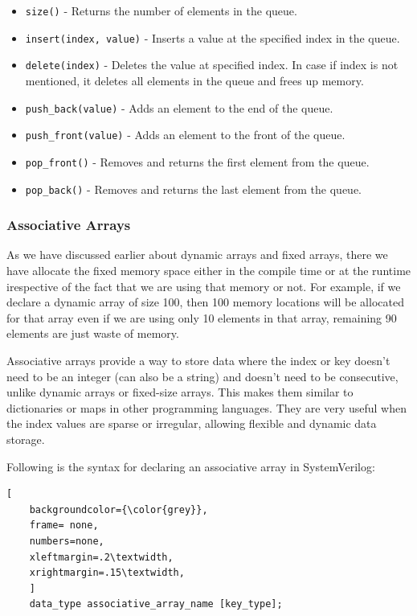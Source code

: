 \documentclass[12pt, a4paper]{article}
\begin{document}
\begin{itemize}[nosep]
    \item \texttt{size()} - Returns the number of elements in the queue.
    \item \texttt{insert(index, value)} - Inserts a value at the specified index in the queue.
    \item \texttt{delete(index)} - Deletes the value at specified index. In case if index is not mentioned, it deletes all elements in the queue and frees up memory.
    \item \texttt{push\_back(value)} - Adds an element to the end of the queue.
    \item \texttt{push\_front(value)} - Adds an element to the front of the queue.
    \item \texttt{pop\_front()} - Removes and returns the first element from the queue.
    \item \texttt{pop\_back()} - Removes and returns the last element from the queue.
\end{itemize}

\subsubsection{Associative Arrays}
As we have discussed earlier about dynamic arrays and fixed arrays, there we have allocate the fixed memory space either in the compile time or at the runtime irespective of the fact that we are using that memory or not. For example, if we declare a dynamic array of size 100, then 100 memory locations will be allocated for that array even if we are using only 10 elements in that array, remaining 90 elements are just waste of memory. 

\vspace{1em}

Associative arrays provide a way to store data where the index or key doesn't need to be an integer (can also be a string) and doesn't need to be consecutive, unlike dynamic arrays or fixed-size arrays. This makes them similar to dictionaries or maps in other programming languages. They are very useful when the index values are sparse or irregular, allowing flexible and dynamic data storage.

Following is the syntax for declaring an associative array in SystemVerilog:
\begin{lstlisting}[
    backgroundcolor={\color{grey}},
    frame= none,
    numbers=none,
    xleftmargin=.2\textwidth,
    xrightmargin=.15\textwidth, 
    ]
    data_type associative_array_name [key_type];
\end{lstlisting}
\end{document}
